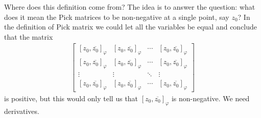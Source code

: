 Where does this definition come from? The idea is to answer the question: what does it mean the Pick matrices to be non-negative at a single point, say $z_{0}$? In the definition of Pick matrix we could let all the variables be equal and conclude that the matrix
\begin{align*}
\begin{bmatrix}
	[z_{0}, \overline{z_{0}}]_{\varphi} & [z_{0}, \overline{z_{0}}]_{\varphi} & \cdots & [z_{0}, \overline{z_{0}}]_{\varphi} \\
	[z_{0}, \overline{z_{0}}]_{\varphi} & [z_{0}, \overline{z_{0}}]_{\varphi} & \cdots & [z_{0}, \overline{z_{0}}]_{\varphi} \\
	\vdots & \vdots & \ddots & \vdots \\
	[z_{0}, \overline{z_{0}}]_{\varphi} & [z_{0}, \overline{z_{0}}]_{\varphi} & \cdots &  [z_{0}, \overline{z_{0}}]_{\varphi}
\end{bmatrix}
\end{align*}
is positive, but this would only tell us that $[z_{0}, \overline{z_{0}}]_{\varphi}$ is non-negative. We need derivatives.

